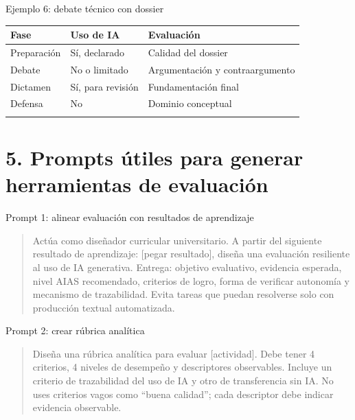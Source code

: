 \documentclass[
  ignorenonframetext,
  aspectratio=169,
  spanish,
]{beamer}
\newcounter{none} %
\begin{document}
\begin{frame}{Ejemplo 6: debate técnico con dossier}
\protect{}\label{ejemplo-6-debate-tuxe9cnico-con-dossier}
{\def\LTcaptype{none} %
\begin{longtable}[]{@{}lll@{}}
\toprule\noalign{}
Fase & Uso de IA & Evaluación \\
\midrule\noalign{}
\endhead
Preparación & Sí, declarado & Calidad del dossier \\
Debate & No o limitado & Argumentación y contraargumento \\
Dictamen & Sí, para revisión & Fundamentación final \\
Defensa & No & Dominio conceptual \\
\bottomrule\noalign{}
\end{longtable}
}
\end{frame}

\section{5. Prompts útiles para generar herramientas de
evaluación}\label{prompts-uxfatiles-para-generar-herramientas-de-evaluaciuxf3n}

\begin{frame}{Prompt 1: alinear evaluación con resultados de
aprendizaje}
\protect{}\label{prompt-1-alinear-evaluaciuxf3n-con-resultados-de-aprendizaje}
\begin{quote}
Actúa como diseñador curricular universitario. A partir del siguiente
resultado de aprendizaje: {[}pegar resultado{]}, diseña una evaluación
resiliente al uso de IA generativa. Entrega: objetivo evaluativo,
evidencia esperada, nivel AIAS recomendado, criterios de logro, forma de
verificar autonomía y mecanismo de trazabilidad. Evita tareas que puedan
resolverse solo con producción textual automatizada.
\end{quote}
\end{frame}

\begin{frame}{Prompt 2: crear rúbrica analítica}
\protect{}\label{prompt-2-crear-ruxfabrica-analuxedtica}
\begin{quote}
Diseña una rúbrica analítica para evaluar {[}actividad{]}. Debe tener 4
criterios, 4 niveles de desempeño y descriptores observables. Incluye un
criterio de trazabilidad del uso de IA y otro de transferencia sin IA.
No uses criterios vagos como ``buena calidad''; cada descriptor debe
indicar evidencia observable.
\end{quote}
\end{frame}
\end{document}
